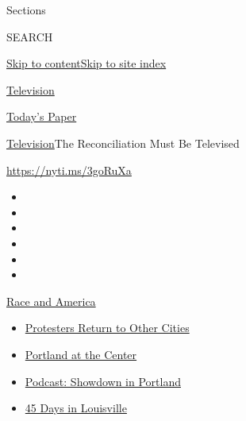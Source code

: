 Sections

SEARCH

\protect\hyperlink{site-content}{Skip to
content}\protect\hyperlink{site-index}{Skip to site index}

\href{https://www.nytimes3xbfgragh.onion/section/arts/television}{Television}

\href{https://myaccount.nytimes3xbfgragh.onion/auth/login?response_type=cookie\&client_id=vi}{}

\href{https://www.nytimes3xbfgragh.onion/section/todayspaper}{Today's
Paper}

\href{/section/arts/television}{Television}\textbar{}The Reconciliation
Must Be Televised

\url{https://nyti.ms/3goRuXa}

\begin{itemize}
\item
\item
\item
\item
\item
\item
\end{itemize}

\href{https://www.nytimes3xbfgragh.onion/news-event/george-floyd-protests-minneapolis-new-york-los-angeles?action=click\&pgtype=Article\&state=default\&region=TOP_BANNER\&context=storylines_menu}{Race
and America}

\begin{itemize}
\tightlist
\item
  \href{https://www.nytimes3xbfgragh.onion/2020/07/26/us/protests-portland-seattle-trump.html?action=click\&pgtype=Article\&state=default\&region=TOP_BANNER\&context=storylines_menu}{Protesters
  Return to Other Cities}
\item
  \href{https://www.nytimes3xbfgragh.onion/2020/07/24/us/portland-oregon-protests-white-race.html?action=click\&pgtype=Article\&state=default\&region=TOP_BANNER\&context=storylines_menu}{Portland
  at the Center}
\item
  \href{https://www.nytimes3xbfgragh.onion/2020/07/23/podcasts/the-daily/portland-protests.html?action=click\&pgtype=Article\&state=default\&region=TOP_BANNER\&context=storylines_menu}{Podcast:
  Showdown in Portland}
\item
  \href{https://www.nytimes3xbfgragh.onion/interactive/2020/07/16/us/black-lives-matter-protests-louisville-breonna-taylor.html?action=click\&pgtype=Article\&state=default\&region=TOP_BANNER\&context=storylines_menu}{45
  Days in Louisville}
\end{itemize}

